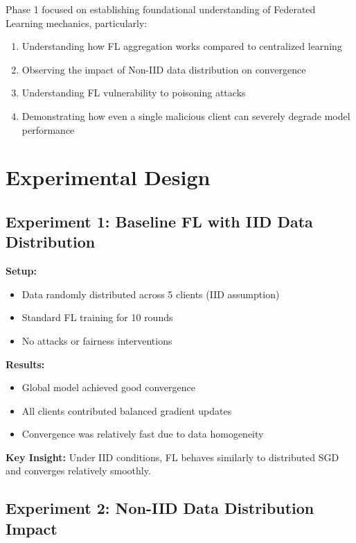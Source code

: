 \documentclass[11pt,a4paper]{report}
\begin{document}
Phase 1 focused on establishing foundational understanding of Federated Learning mechanics, particularly:

\begin{enumerate}
    \item Understanding how FL aggregation works compared to centralized learning
    \item Observing the impact of Non-IID data distribution on convergence
    \item Understanding FL vulnerability to poisoning attacks
    \item Demonstrating how even a single malicious client can severely degrade model performance
\end{enumerate}

\section{Experimental Design}

\subsection{Experiment 1: Baseline FL with IID Data Distribution}

\textbf{Setup:}
\begin{itemize}
    \item Data randomly distributed across 5 clients (IID assumption)
    \item Standard FL training for 10 rounds
    \item No attacks or fairness interventions
\end{itemize}

\textbf{Results:}
\begin{itemize}
    \item Global model achieved good convergence
    \item All clients contributed balanced gradient updates
    \item Convergence was relatively fast due to data homogeneity
\end{itemize}

\textbf{Key Insight:} Under IID conditions, FL behaves similarly to distributed SGD and converges relatively smoothly.

\subsection{Experiment 2: Non-IID Data Distribution Impact}
\end{document}
